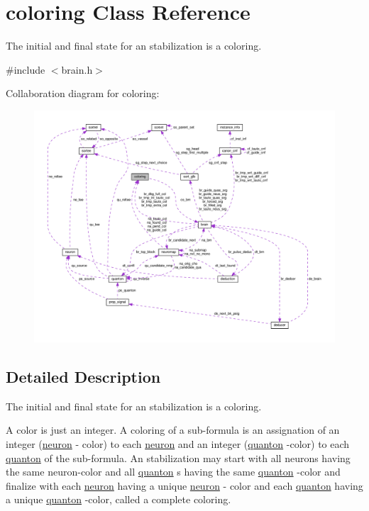 \hypertarget{classcoloring}{\section{coloring Class Reference}
\label{classcoloring}
}


The initial and final state for an stabilization is a coloring.  




{\ttfamily \#include $<$brain.\+h$>$}



Collaboration diagram for coloring\+:\nopagebreak
\begin{figure}[H]
\begin{center}
\leavevmode
\includegraphics[width=350pt]{d0/d84/classcoloring__coll__graph}
\end{center}
\end{figure}


\subsection{Detailed Description}
The initial and final state for an stabilization is a coloring. 

A color is just an integer. A coloring of a sub-\/formula is an assignation of an integer (\hyperlink{classneuron}{neuron} -\/ color) to each \hyperlink{classneuron}{neuron} and an integer (\hyperlink{classquanton}{quanton} -\/color) to each \hyperlink{classquanton}{quanton} of the sub-\/formula. An stabilization may start with all neurons having the same neuron-\/color and all \hyperlink{classquanton}{quanton} s having the same \hyperlink{classquanton}{quanton} -\/color and finalize with each \hyperlink{classneuron}{neuron} having a unique \hyperlink{classneuron}{neuron} -\/ color and each \hyperlink{classquanton}{quanton} having a unique \hyperlink{classquanton}{quanton} -\/color, called a complete coloring.

